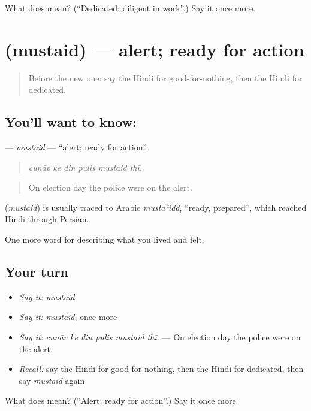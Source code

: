 \begin{tcolorbox}[breakable,colback=teal!4,colframe=teal!35!black,title={Before you move on}]
What does  mean? (\textquotedblleft{}Dedicated; diligent in work\textquotedblright{}.) Say it once more.
\end{tcolorbox}
\section[\texorpdfstring{\hi{मुस्तैद} (mustaid)}{मुस्तैद (mustaid)}]{ (mustaid) — alert; ready for action}

\label{lesson:HI-C472-mustaid}



\begin{quote}
Before the new one: say the Hindi for good-for-nothing, then the Hindi for dedicated.
\end{quote}

\subsection*{You'll want to know: }
\textbf{} — \emph{mustaid} — \textquotedblleft{}alert; ready for action\textquotedblright{}.

\begin{quote}
     
\end{quote}

\begin{quote}
\emph{cunāv ke din pulis mustaid thī.}
\end{quote}

\begin{quote}
On election day the police were on the alert.
\end{quote}

\begin{cousinweb}
\textbf{} (\emph{mustaid}) is usually traced to Arabic \emph{mustaʿidd}, \textquotedblleft{}ready, prepared\textquotedblright{}, which reached Hindi through Persian.
\end{cousinweb}

\begin{grammarlens}[title={What you've built}]
One more word for describing what you lived and felt.
\end{grammarlens}

\subsection*{Your turn}
\begin{itemize}
\raggedright
  \item \emph{Say it:} \emph{mustaid}
  \item \emph{Say it:} \emph{mustaid}, once more
  \item \emph{Say it:} \emph{cunāv ke din pulis mustaid thī.} — On election day the police were on the alert.
  \item \emph{Recall:} say the Hindi for good-for-nothing, then the Hindi for dedicated, then say \emph{mustaid} again
\end{itemize}

\begin{tcolorbox}[breakable,colback=teal!4,colframe=teal!35!black,title={Before you move on}]
What does  mean? (\textquotedblleft{}Alert; ready for action\textquotedblright{}.) Say it once more.
\end{tcolorbox}
